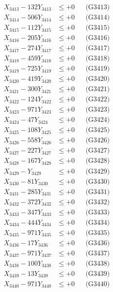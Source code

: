 \documentclass[a4paper,10pt]{article}
\begin{document}
{\begin{align}
X_{3413} - 132Y_{3413} &\leq +0 && \text{(G3413)} \\
X_{3414} - 506Y_{3414} &\leq +0 && \text{(G3414)} \\
X_{3415} - 112Y_{3415} &\leq +0 && \text{(G3415)} \\
X_{3416} - 205Y_{3416} &\leq +0 && \text{(G3416)} \\
X_{3417} - 274Y_{3417} &\leq +0 && \text{(G3417)} \\
X_{3418} - 459Y_{3418} &\leq +0 && \text{(G3418)} \\
X_{3419} - 725Y_{3419} &\leq +0 && \text{(G3419)} \\
X_{3420} - 419Y_{3420} &\leq +0 && \text{(G3420)} \\
\allowbreak
X_{3421} - 300Y_{3421} &\leq +0 && \text{(G3421)} \\
X_{3422} - 124Y_{3422} &\leq +0 && \text{(G3422)} \\
X_{3423} - 971Y_{3423} &\leq +0 && \text{(G3423)} \\
X_{3424} - 47Y_{3424} &\leq +0 && \text{(G3424)} \\
X_{3425} - 108Y_{3425} &\leq +0 && \text{(G3425)} \\
X_{3426} - 558Y_{3426} &\leq +0 && \text{(G3426)} \\
X_{3427} - 227Y_{3427} &\leq +0 && \text{(G3427)} \\
X_{3428} - 167Y_{3428} &\leq +0 && \text{(G3428)} \\
X_{3429} - Y_{3429} &\leq +0 && \text{(G3429)} \\
X_{3430} - 81Y_{3430} &\leq +0 && \text{(G3430)} \\
\allowbreak
X_{3431} - 285Y_{3431} &\leq +0 && \text{(G3431)} \\
X_{3432} - 372Y_{3432} &\leq +0 && \text{(G3432)} \\
X_{3433} - 347Y_{3433} &\leq +0 && \text{(G3433)} \\
X_{3434} - 444Y_{3434} &\leq +0 && \text{(G3434)} \\
X_{3435} - 971Y_{3435} &\leq +0 && \text{(G3435)} \\
X_{3436} - 17Y_{3436} &\leq +0 && \text{(G3436)} \\
X_{3437} - 971Y_{3437} &\leq +0 && \text{(G3437)} \\
X_{3438} - 100Y_{3438} &\leq +0 && \text{(G3438)} \\
X_{3439} - 13Y_{3439} &\leq +0 && \text{(G3439)} \\
X_{3440} - 971Y_{3440} &\leq +0 && \text{(G3440)} \\

\end{align}}
\end{document}
